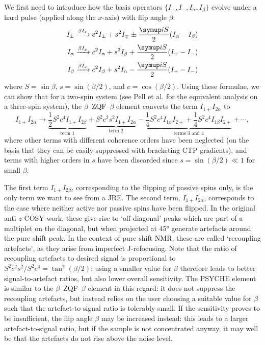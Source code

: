 We first need to introduce how the basis operators $\{I_+, I_-, I_\alpha, I_\beta\}$ evolve under a hard pulse (applied along the $x$-axis) with flip angle $\beta$:
\begin{align}
    I_{\pm} &\xrightarrow{\beta I_x} c^2 I_{\pm} + s^2I_{\mp} \pm \frac{\mi S}{2}(I_\alpha - I_\beta) \label{eq:ipm_beta_evolution} \\
    I_{\alpha} &\xrightarrow{\beta I_x} c^2 I_{\alpha} + s^2I_{\beta} + \frac{\mi S}{2}(I_+ - I_-) \label{eq:ialpha_beta_evolution} \\
    I_{\beta} &\xrightarrow{\beta I_x} c^2 I_{\beta} + s^2I_{\alpha} - \frac{\mi S}{2}(I_+ - I_-) \label{eq:ibeta_beta_evolution}
\end{align}
where $S = \sin\beta$, $s = \sin(\beta/2)$, and $c = \cos(\beta/2)$.
Using these formulae, we can show that for a two-spin system (see Pell et al.\autocite{Pell2007MRC} for the equivalent analysis on a three-spin system), the $\beta$--ZQF--$\beta$ element converts the term $I_{1+}I_{2\alpha}$ to
\begin{equation}
    \label{eq:anti_z_cosy_transitions}
    I_{1+}I_{2\alpha} \longrightarrow
    {\underbrace{\frac{1}{2}S^2c^4 I_{1+}I_{2\beta}}_\text{term 1}}
    + {\underbrace{S^2c^2s^2I_{1+}I_{2\alpha}}_{\text{term 2}}}
    - {\underbrace{\frac{1}{4}S^2c^4I_{1\alpha}I_{2+}
    + \frac{1}{4}S^2c^4I_{1\beta}I_{2+}}_{\text{terms 3 and 4}}}
    + \cdots,
\end{equation}
where other terms with different coherence orders have been neglected (on the basis that they can be easily suppressed with bracketing CTP gradients), and terms with higher orders in $s$ have been discarded since $s = \sin(\beta/2) \ll 1$ for small $\beta$.

The first term $I_{1+}I_{2\beta}$, corresponding to the flipping of passive spins only, is the only term we want to see from a JRE.
The second term, $I_{1+}I_{2\alpha}$, corresponds to the case where neither active nor passive spins have been flipped.
In the original anti $z$-COSY work, these give rise to `off-diagonal' peaks which are part of a multiplet on the diagonal, but when projected at \ang{45} generate artefacts around the pure shift peak.
In the context of pure shift NMR, these are called `recoupling artefacts', as they arise from imperfect J-refocusing.
Note that the ratio of recoupling artefacts to desired signal is proportional to $S^2c^2s^2/S^2c^4 = \tan^2(\beta/2)$: using a smaller value for $\beta$ therefore leads to better signal-to-artefact ratios, but also lower overall sensitivity.
The PSYCHE element is similar to the $\beta$--ZQF--$\beta$ element in this regard: it does not suppress the recoupling artefacts, but instead relies on the user choosing a suitable value for $\beta$ such that the artefact-to-signal ratio is tolerably small.
If the sensitivity proves to be insufficient, the flip angle $\beta$ may be increased instead: this leads to a larger artefact-to-signal ratio, but if the sample is not concentrated anyway, it may well be that the artefacts do not rise above the noise level.%

